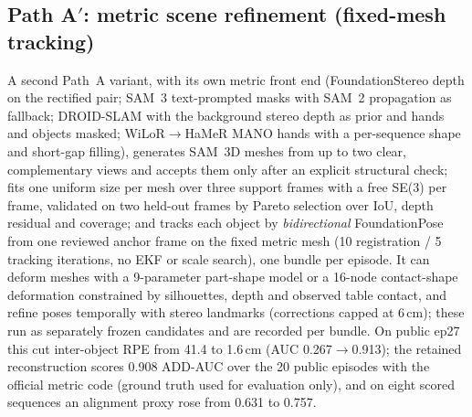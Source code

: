 \subsection{Path A$'$: metric scene refinement (fixed-mesh tracking)}
\label{sec:wentao}
A second Path~A variant, with its own metric front end (FoundationStereo depth on the
rectified pair; SAM~3 text-prompted masks with SAM~2 propagation as fallback; DROID-SLAM with the
background stereo depth as prior and hands and objects masked; WiLoR$\rightarrow$HaMeR MANO hands
with a per-sequence shape and short-gap filling), generates SAM~3D meshes from up to two clear,
complementary views and accepts them only after an explicit structural check; fits one uniform
size per mesh over three support frames with a free SE(3) per frame, validated on two held-out
frames by Pareto selection over IoU, depth residual and coverage; and tracks each object by
\emph{bidirectional} FoundationPose from one reviewed anchor frame on the fixed metric mesh
(10 registration / 5 tracking iterations, no EKF or scale search), one bundle per episode. It can
deform meshes with a 9-parameter part-shape model or a 16-node contact-shape deformation
constrained by silhouettes, depth and observed table contact, and refine poses temporally with
stereo landmarks (corrections capped at 6\,cm); these run as separately frozen candidates and are
recorded per bundle. On public ep27 this cut inter-object RPE from 41.4 to 1.6\,cm (AUC
0.267$\rightarrow$0.913); the retained reconstruction scores 0.908 ADD-AUC over the 20 public
episodes with the official metric code (ground truth used for evaluation only), and on eight
scored sequences an alignment proxy rose from 0.631 to 0.757.

